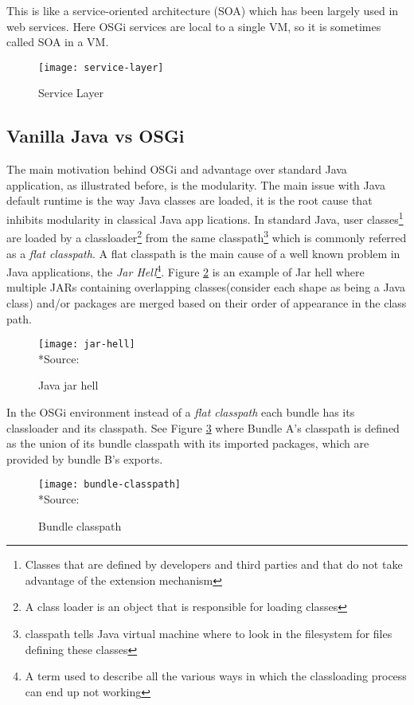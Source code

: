 This is like a service-oriented architecture (SOA) which has been largely used in web services. Here OSGi services are local to a single VM, so it is sometimes called SOA in a VM.

\begin{figure}[h]
\label{service layer}
\caption{Service Layer}
\centering
\texttt{[image: service-layer]}
\end{figure}
\FloatBarrier


\subsection{Vanilla Java vs OSGi}
The main motivation behind OSGi and advantage over standard Java application, as illustrated before, is the modularity. The main issue with Java default runtime is the way Java classes are loaded, it is the root cause that inhibits modularity in classical Java app
lications. In standard Java, user classes\footnote{Classes that are defined by developers and third parties and that do not take advantage of the extension mechanism} are loaded by a classloader\footnote{A class loader is an object that is responsible for loading classes} from the same classpath\footnote{classpath tells Java virtual machine where to look in the filesystem for files defining these classes} which is commonly referred as a \emph{flat classpath}. A flat classpath is the main cause of a well known problem in Java applications, the \emph{Jar Hell}\footnote{A term used to describe all the various ways in which the classloading process can end up not working}. Figure \ref{jar hell} is an example of Jar hell where multiple JARs containing overlapping classes(consider each shape as being a Java class) and/or packages are merged based on their order of appearance in the class path.


\begin{figure}[h]
\caption{Java jar hell}
\label{jar hell}
\centering
\texttt{[image: jar-hell]}
\\*Source: \cite[p. 7]{Hall 2011}
\end{figure}  
\FloatBarrier


 In the OSGi environment instead of a \emph{flat classpath} each bundle has its classloader and its classpath. See Figure \ref{bundle classpath} where Bundle A’s classpath is defined as the union of its bundle classpath with its imported packages, which are provided by bundle B’s exports.


\begin{figure}[h]
\caption{Bundle classpath}
\label{bundle classpath}
\centering
\texttt{[image: bundle-classpath]}
\\*Source: \cite[p. 59]{Hall 2011}
\end{figure}  
\FloatBarrier

